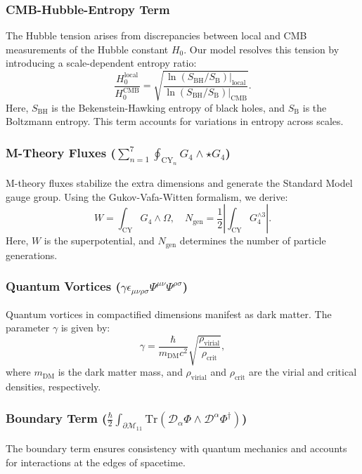 \documentclass[12pt, a4paper]{article}
\begin{document}
\subsubsection{CMB-Hubble-Entropy Term}
The Hubble tension arises from discrepancies between local and CMB measurements of the Hubble constant \(H_0\). Our model resolves this tension by introducing a scale-dependent entropy ratio:
\[
\frac{H_0^{\text{local}}}{H_0^{\text{CMB}}} = \sqrt{\frac{\ln(S_{\text{BH}}/S_{\text{B}})|_{\text{local}}}{\ln(S_{\text{BH}}/S_{\text{B}})|_{\text{CMB}}}}.
\]
Here, \(S_{\text{BH}}\) is the Bekenstein-Hawking entropy of black holes, and \(S_{\text{B}}\) is the Boltzmann entropy. This term accounts for variations in entropy across scales.

\subsubsection{M-Theory Fluxes ($\sum_{n=1}^7 \oint_{\text{CY}_n} G_4 \wedge \star G_4$)}
M-theory fluxes stabilize the extra dimensions and generate the Standard Model gauge group. Using the Gukov-Vafa-Witten formalism, we derive:
\[
W = \int_{\text{CY}} G_4 \wedge \Omega,\quad N_{\text{gen}} = \frac{1}{2} \left| \int_{\text{CY}} G_4^{\wedge 3} \right|.
\]
Here, \(W\) is the superpotential, and \(N_{\text{gen}}\) determines the number of particle generations.

\subsubsection{Quantum Vortices ($\gamma \epsilon_{\mu\nu\rho\sigma} \Psi^{\mu\nu} \Psi^{\rho\sigma}$)}
Quantum vortices in compactified dimensions manifest as dark matter. The parameter \(\gamma\) is given by:
\[
\gamma = \frac{\hbar}{m_{\text{DM}} c^2} \sqrt{\frac{\rho_{\text{virial}}}{\rho_{\text{crit}}}},
\]
where \(m_{\text{DM}}\) is the dark matter mass, and \(\rho_{\text{virial}}\) and \(\rho_{\text{crit}}\) are the virial and critical densities, respectively.

\subsubsection{Boundary Term ($\frac{\hbar}{2} \int_{\partial\mathcal{M}_{11}} \text{Tr}\left( \mathcal{D}_\alpha \Phi \wedge \mathcal{D}^\alpha \Phi^\dagger \right)$)}
The boundary term ensures consistency with quantum mechanics and accounts for interactions at the edges of spacetime.
\end{document}
